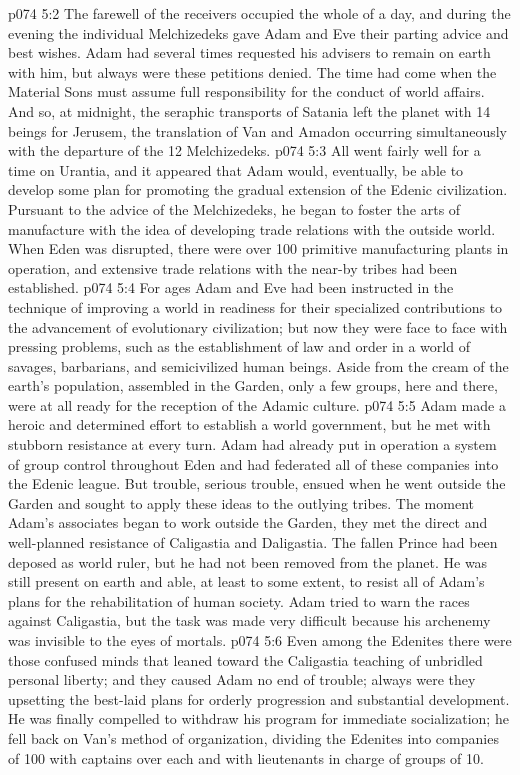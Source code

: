 \vs p074 5:2 The farewell of the receivers occupied the whole of a day, and during the evening the individual Melchizedeks gave Adam and Eve their parting advice and best wishes. Adam had several times requested his advisers to remain on earth with him, but always were these petitions denied. The time had come when the Material Sons must assume full responsibility for the conduct of world affairs. And so, at midnight, the seraphic transports of Satania left the planet with 14 beings for Jerusem, the translation of Van and Amadon occurring simultaneously with the departure of the 12 Melchizedeks.
\vs p074 5:3 \pc All went fairly well for a time on Urantia, and it appeared that Adam would, eventually, be able to develop some plan for promoting the gradual extension of the Edenic civilization. Pursuant to the advice of the Melchizedeks, he began to foster the arts of manufacture with the idea of developing trade relations with the outside world. When Eden was disrupted, there were over 100 primitive manufacturing plants in operation, and extensive trade relations with the near\hyp{}by tribes had been established.
\vs p074 5:4 For ages Adam and Eve had been instructed in the technique of improving a world in readiness for their specialized contributions to the advancement of evolutionary civilization; but now they were face to face with pressing problems, such as the establishment of law and order in a world of savages, barbarians, and semicivilized human beings. Aside from the cream of the earth’s population, assembled in the Garden, only a few groups, here and there, were at all ready for the reception of the Adamic culture.
\vs p074 5:5 Adam made a heroic and determined effort to establish a world government, but he met with stubborn resistance at every turn. Adam had already put in operation a system of group control throughout Eden and had federated all of these companies into the Edenic league. But trouble, serious trouble, ensued when he went outside the Garden and sought to apply these ideas to the outlying tribes. The moment Adam’s associates began to work outside the Garden, they met the direct and well\hyp{}planned resistance of Caligastia and Daligastia. The fallen Prince had been deposed as world ruler, but he had not been removed from the planet. He was still present on earth and able, at least to some extent, to resist all of Adam’s plans for the rehabilitation of human society. Adam tried to warn the races against Caligastia, but the task was made very difficult because his archenemy was invisible to the eyes of mortals.
\vs p074 5:6 Even among the Edenites there were those confused minds that leaned toward the Caligastia teaching of unbridled personal liberty; and they caused Adam no end of trouble; always were they upsetting the best\hyp{}laid plans for orderly progression and substantial development. He was finally compelled to withdraw his program for immediate socialization; he fell back on Van’s method of organization, dividing the Edenites into companies of 100 with captains over each and with lieutenants in charge of groups of 10.
